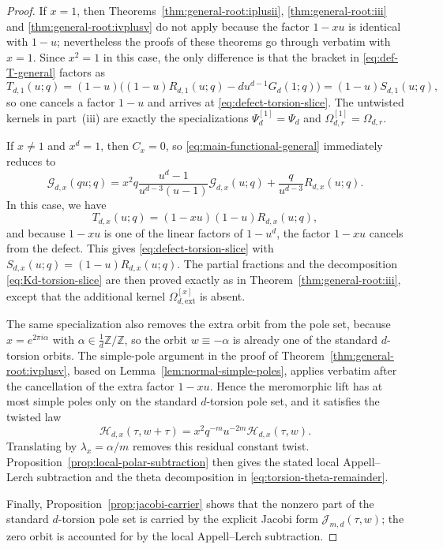 \documentclass[12pt]{amsart}
\numberwithin{equation}{section}
\newcommand{\ZZ}{\mathbb Z}
\begin{document}
\begin{proof}
If $x=1$, then Theorems~\ref{thm:general-root:iplusii}, \ref{thm:general-root:iii} and \ref{thm:general-root:ivplusv} do not apply because the factor $1-xu$ is identical with $1-u$; nevertheless the proofs of these theorems go through verbatim with $x=1$.  Since $x^2=1$ in this case, the only difference is that the bracket in \eqref{eq:def-T-general} factors as
\[
T_{d,1}(u;q)=(1-u)\bigl((1-u)R_{d,1}(u;q)-du^{d-1}G_d(1;q)\bigr)=(1-u)S_{d,1}(u;q),
\]
so one cancels a factor $1-u$ and arrives at \eqref{eq:defect-torsion-slice}.  The untwisted kernels in part~(iii) are exactly the specializations $\Psi_d^{[1]}=\Psi_d$ and $\Omega_{d,r}^{[1]}=\Omega_{d,r}$.

If $x\neq 1$ and $x^d=1$, then $C_x=0$, so \eqref{eq:main-functional-general} immediately reduces to
\[
\mathcal G_{d,x}(qu;q)
=
x^2q\frac{u^d-1}{u^{d-3}(u-1)}\mathcal G_{d,x}(u;q)
+
\frac{q}{u^{d-3}}R_{d,x}(u;q).
\]
In this case, we have
\[
T_{d,x}(u;q)=(1-xu)(1-u)R_{d,x}(u;q),
\]
and because $1-xu$ is one of the linear factors of $1-u^d$, the factor $1-xu$ cancels from the defect.  This gives \eqref{eq:defect-torsion-slice} with $S_{d,x}(u;q)=(1-u)R_{d,x}(u;q)$.  The partial fractions and the decomposition \eqref{eq:Kd-torsion-slice} are then proved exactly as in Theorem~\ref{thm:general-root:iii}, except that the additional kernel $\Omega_{d,\mathrm{ext}}^{[x]}$ is absent.

The same specialization also removes the extra orbit from the pole set, because \(x=e^{2\pi i\alpha}\) with \(\alpha\in \frac1d\ZZ/\ZZ\), so the orbit \(w\equiv -\alpha\) is already one of the standard \(d\)-torsion orbits.  The simple-pole argument in the proof of Theorem~\ref{thm:general-root:ivplusv}, based on Lemma~\ref{lem:normal-simple-poles}, applies verbatim after the cancellation of the extra factor \(1-xu\).  Hence the meromorphic lift has at most simple poles only on the standard \(d\)-torsion pole set, and it satisfies the twisted law
\[
\mathcal H_{d,x}(\tau,w+\tau)=x^2q^{-m}u^{-2m}\mathcal H_{d,x}(\tau,w).
\]
Translating by \(\lambda_x=\alpha/m\) removes this residual constant twist.  Proposition~\ref{prop:local-polar-subtraction} then gives the stated local Appell--Lerch subtraction and the theta decomposition in \eqref{eq:torsion-theta-remainder}.

Finally, Proposition~\ref{prop:jacobi-carrier} shows that the nonzero part of the standard \(d\)-torsion pole set is carried by the explicit Jacobi form \(\mathcal J_{m,d}(\tau,w)\); the zero orbit is accounted for by the local Appell--Lerch subtraction.
\end{proof}
\end{document}
